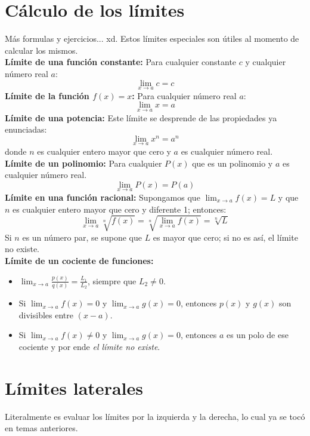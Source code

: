 \documentclass[letterpaper, 12pt]{article}
\begin{document}
    \section{Cálculo de los límites}
    Más formulas y ejercicios... xd. Estos límites especiales son útiles al momento de calcular los mismos.
    \\\newline
    \textbf{Límite de una función constante:}
    Para cualquier constante \(c\) y cualquier número real \(a\):
    \[\lim_{x\rightarrow a}c=c\]
    \textbf{Límite de la función \(f(x)=x\):}
    Para cualquier número real \(a\):
    \[\lim_{x \rightarrow a}x=a\]
    \textbf{Límite de una potencia:}
    Este límite se desprende de las propiedades ya enunciadas:
    \[\lim_{x \rightarrow a}x^n=a^n\]
    donde \(n\) es cualquier entero mayor que cero y \(a\) es cualquier número real.
    \\\newline
    \textbf{Límite de un polinomio:}
    Para cualquier \(P(x)\) que es un polinomio y \(a\) es cualquier número real.
    \[\lim_{x\rightarrow a}P(x)=P(a)\]
    \textbf{Límite en una función racional:}
    Supongamos que \(\lim_{x \rightarrow a}f(x)=L\) y que \(n\) es cualquier entero mayor que cero y diferente 1; entonces:
    \[\lim_{x \rightarrow a}\sqrt[n]{f(x)}=\sqrt[n]{\lim_{x \rightarrow a}f(x)}=\sqrt[n]{L}\]
    Si \(n\) es un número par, se supone que \(L\) es mayor que cero; si no es así, el límite no existe.
    \\\newline
    \textbf{Límite de un cociente de funciones:}
    \begin{itemize}
        \item \(\lim_{x\rightarrow a}\frac{p(x)}{q(x)}=\frac{L_1}{L_2}\), siempre que \(L_2\neq 0\).
        \item Si \(\lim_{x \rightarrow a}f(x)=0\) y \(\lim_{x \rightarrow a}g(x)=0\), entonces \(p(x)\) y \(g(x)\) son divisibles entre \((x-a)\).
        \item Si \(\lim_{x \rightarrow a}f(x)\neq 0\) y \(\lim_{x \rightarrow a}g(x)=0\), entonces \(a\) es un polo de ese cociente y por ende \emph{el límite no existe}.
    \end{itemize}
    \section{Límites laterales}
    Literalmente es evaluar los límites por la izquierda y la derecha, lo cual ya se tocó en temas anteriores.
\end{document}
